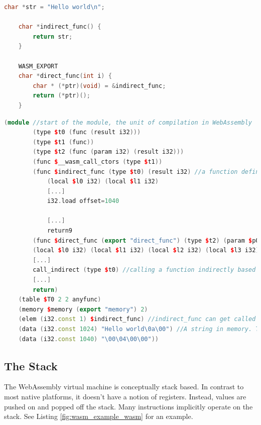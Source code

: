 \documentclass[sigconf]{acmart}
\begin{document}
\begin{lstlisting}[language=C++, caption={A C program, which, when compiled without optimizations, gets translated to the code in Observe \ref{fig:wasm_example_wasm}.}, label=fig:wasm_example_c]
	char *str = "Hello world\n";

	char *indirect_func() {
		return str;
	}

	WASM_EXPORT
	char *direct_func(int i) { 
		char * (*ptr)(void) = &indirect_func;
		return (*ptr)();
	} 
\end{lstlisting}

\begin{lstlisting}[language=C++, caption={The C program in Listing \ref{fig:wasm_example_c} gets compiled to this WebAssembly program (with uninteresting parts removed). Observe the indirect call, function table and memory region.}, label={fig:wasm_example_wasm}]
	(module //start of the module, the unit of compilation in WebAssembly
		(type $t0 (func (result i32)))
		(type $t1 (func))
		(type $t2 (func (param i32) (result i32)))
		(func $__wasm_call_ctors (type $t1))
		(func $indirect_func (type $t0) (result i32) //a function definition
			(local $l0 i32) (local $l1 i32)
			[...]
			i32.load offset=1040
			
			[...]
			return9
		(func $direct_func (export "direct_func") (type $t2) (param $p0 i32) (result i32)
		(local $l0 i32) (local $l1 i32) (local $l2 i32) (local $l3 i32) (local $l4 i32) (local $l5 i32) (local $l6 i32) (local $l7 i32)
		[...]
		call_indirect (type $t0) //calling a function indirectly based on the index pushed onto the stack
		[...]
		return)
	(table $T0 2 2 anyfunc)
	(memory $memory (export "memory") 2) 
	(elem (i32.const 1) $indirect_func) //indirect_func can get called indirectly by pushing '1' onto the stack 
	(data (i32.const 1024) "Hello world\0a\00") //A string in memory. There exists no constant storage in WebAssembly.
	(data (i32.const 1040) "\00\04\00\00"))
\end{lstlisting}

\subsection{The Stack}
\label{sec:wasm_stack}
The WebAssembly virtual machine is conceptually stack based. In contrast to most native platforms, it doesn't have a notion of registers. Instead, values are pushed on and popped off the stack. Many instructions implicitly operate on the stack. See Listing \ref{fig:wasm_example_wasm} for an example.
\end{document}
